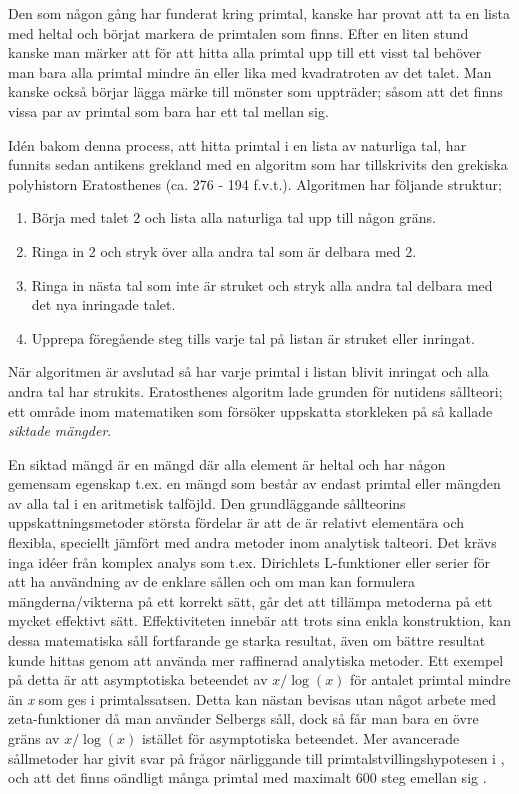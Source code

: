 Den som någon gång har funderat kring primtal, kanske har provat att ta en lista med heltal och börjat markera de primtalen som finns. 
Efter en liten stund kanske man märker att för att hitta alla primtal upp till ett visst tal behöver man bara alla primtal mindre än eller lika med kvadratroten av det talet. 
Man kanske också börjar lägga märke till mönster som uppträder; såsom att det finns vissa par av primtal som bara har ett tal mellan sig. 

Idén bakom denna process, att hitta primtal i en lista av naturliga tal, har funnits sedan antikens grekland med en algoritm som har tillskrivits den grekiska polyhistorn Eratosthenes (ca. 276 - 194 f.v.t.). Algoritmen har följande struktur;
\begin{enumerate}
    \item Börja med talet 2 och lista alla naturliga tal upp till någon gräns.
    \item Ringa in 2 och stryk över alla andra tal som är delbara med 2.
    \item Ringa in nästa tal som inte är struket och stryk alla andra tal delbara med det nya inringade talet.
    \item Upprepa föregående steg tills varje tal på listan är struket eller inringat. 
\end{enumerate}
När algoritmen är avslutad så har varje primtal i listan blivit inringat och alla andra tal har strukits. 
Eratosthenes algoritm lade grunden för nutidens sållteori; ett område inom matematiken som försöker uppskatta storkleken på så kallade \textit{siktade mängder}. 

En siktad mängd är en mängd där alla element är heltal och har någon gemensam egenskap t.ex. en mängd som består av endast primtal eller mängden av alla tal i en aritmetisk talföjld.
Den grundläggande sållteorins uppskattningsmetoder största fördelar är att de är relativt elementära och flexibla, speciellt jämfört med andra metoder inom analytisk talteori. 
Det krävs inga idéer från komplex analys som t.ex. Dirichlets L-funktioner eller serier för att ha användning av de enklare sållen och om man kan formulera mängderna/vikterna på ett korrekt sätt, går det att tillämpa metoderna på ett mycket effektivt sätt. 
Effektiviteten innebär att trots sina enkla konstruktion, kan dessa matematiska såll fortfarande ge starka resultat, även om bättre resultat kunde hittas genom att använda mer raffinerad analytiska metoder. 
Ett exempel på detta är att asymptotiska beteendet av \(x/\log(x)\) för antalet primtal mindre än \textit{x} som ges i primtalssatsen. 
Detta kan nästan bevisas utan något arbete med zeta-funktioner då man använder Selbergs såll, dock så får man bara en övre gräns av \(x/\log(x)\) istället för asymptotiska beteendet. 
Mer avancerade sållmetoder har givit svar på frågor närliggande till primtalstvillingshypotesen i \cite{chen2Prime}, och att det finns oändligt många primtal med maximalt 600 steg emellan sig \cite{mayBound}.

